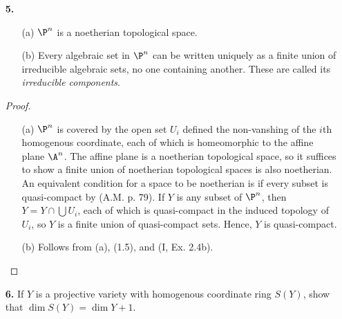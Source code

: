 \documentclass[a4paper]{article}
\begin{document}
\begin{enumerate} [label=\textbf{\arabic*.}, leftmargin=0cm]
\begin{proof}
\begin{itemize} [leftmargin=0cm]
                        Conversely, let $\goth{p}$ be a homogenous prime ideal, and suppose that $Z(\goth{p}) = Y_1 \cup Y_2$. Then $\goth{p} = I(Y_1) \cap I(Y_2)$, so either $\goth{p} = I(Y_1)$ or $\goth{p} = I(Y_2)$. Thus, $Z(\goth{p}) = Y_1$ or $Y_2$, hence it is irreducible.

                  \item[(c)] $I(\P^n) = (0)$, which is a prime ideal.
              \end{itemize}
          \end{proof}

    \item[\textbf{5.}] \begin{itemize}
              \item[(a)] $\P^n$ is a noetherian topological space.
              \item[(b)] Every algebraic set in $\P^n$ can be written uniquely as a finite union of irreducible algebraic sets, no one containing another. These are called its \textit{irreducible components}.
          \end{itemize}

          \begin{proof} $ $ \vspace{0pt}
              \begin{itemize} [leftmargin=0cm]
                  \item[(a)] $\P^n$ is covered by the open set $U_i$ defined the non-vanshing of the $i$th homogenous coordinate, each of which is homeomorphic to the affine plane $\A^n$.
                        The affine plane is a noetherian topological space, so it suffices to show a finite union of noetherian topological spaces is also noetherian.
                        An equivalent condition for a space to be noetherian is if every subset is quasi-compact by (A.M. p. 79). If $Y$ is any subset of $\P^n$, then $Y = Y \cap \bigcup U_i$, each of which is quasi-compact in the induced topology of $U_i$, so $Y$ is a finite union of quasi-compact sets. Hence, $Y$ is quasi-compact.

                  \item[(b)] Follows from (a), (1.5), and (I, Ex. 2.4b).
              \end{itemize}
          \end{proof}

    \item[\textbf{6.}] If $Y$ is a projective variety with homogenous coordinate ring $S(Y)$, show that $\dim{S(Y)} = \dim{Y} + 1$.


\end{enumerate}
\end{document}
